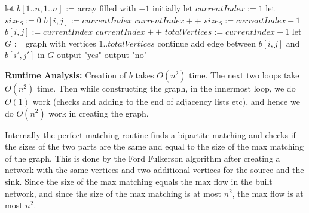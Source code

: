 \documentclass[answers]{exam}
\begin{document}
\begin{questions}
\begin{solution}
        \begin{algorithmic}
                \State let $b[1..n, 1..n]$ := array filled with $-1$ initially 
                \State let $currentIndex := 1$
                \State let $size_S := 0$
                        \State $b[i, j] := currentIndex$
                        \State $currentIndex++$
                    \EndIf
                \EndFor
                \State $size_S := currentIndex - 1$
                        \State $b[i, j] := currentIndex$
                        \State $currentIndex++$
                    \EndIf
                \EndFor
                \State $totalVertices := currentIndex - 1$ 
                \State let $G$ := graph with vertices $1..totalVertices$
                            \State continue
                        \EndIf
                                \State add edge between $b[i, j]$ and $b[i', j']$ in $G$
                            \EndIf
                        \EndFor
                    \EndFor
                \EndFor
                    \State output "yes"
                \Else
                    \State output "no"
                \EndIf
            \EndFunction
        \end{algorithmic}

        \textbf{Runtime Analysis:}
        Creation of $b$ takes $O(n^2)$ time. The next two loops take $O(n^2)$ time. Then while constructing the graph, in the innermost loop, we do $O(1)$ work (checks and adding to the end of
        adjacency lists etc), and hence we do $O(n^2)$ work in creating the graph.

        Internally the perfect matching routine finds a bipartite matching and checks if the sizes of the two parts are the same and equal to the size of the max matching of the graph. This is done by
        the Ford Fulkerson algorithm after creating a network with the same vertices and two additional vertices for the source and the sink. Since the size of the max matching equals the max flow in the built network,
        and since the size of the max matching is at most $n^2$, the max flow is at most $n^2$. 


\end{solution}
\end{questions}
\end{document}
